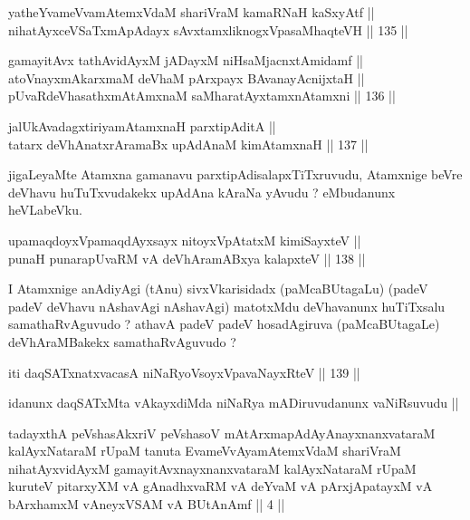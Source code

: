 \begin{shl}
yatheYvameVvamAtemxVdaM shariVraM kamaRNaH kaSxyAtf || \\
nihatAyxceVSaTxmApAdayx sAvxtamxliknogxVpasaMhaqteVH \hfill || 135 ||  
\end{shl}

\begin{shl}
gamayitAvx tathA\s vidAyxM jADayxM niHsaMjacnxtAmidamf ||  \\
atoV\s nayxmAkarxmaM deVhaM pArxpayx BAvanayA\s cnijxtaH || \\
pUvaRdeVhasathxmAtAmxnaM saMharatAyxtamxnA\s \s tamxni \hfill || 136 ||  
\end{shl}

\begin{shl}
jalUkAvadagxtiriyamAtamxnaH parxtipAditA || \\
tatarx deVhAnatxrAramaBx upAdAnaM kimAtamxnaH \hfill || 137 ||  
\end{shl}

\begin{artha}
jigaLeyaMte Atamxna gamanavu parxtipAdisalapxTiTxruvudu, Atamxnige
beVre deVhavu huTuTxvudakekx upAdAna kAraNa yAvudu ? eMbudanunx
heVLabeVku.
\end{artha}


\begin{shl}
upamaqdoyxVpamaqdAyxsayx nitoyxVpAtatxM kimiSayxteV ||  \\
punaH punarapUvaRM vA deVhAramABxya kalapxteV \hfill || 138 ||  
\end{shl}

\begin{artha}
I Atamxnige anAdiyAgi (tAnu) sivxVkarisidadx (paMcaBUtagaLu) (padeV
padeV deVhavu nAshavAgi nAshavAgi) matotxMdu deVhavanunx huTiTxsalu
samathaRvAguvudo ? athavA padeV padeV hosadAgiruva (paMcaBUtagaLe)
deVhAraMBakekx samathaRvAguvudo ?
\end{artha}


\begin{shl}
iti daqSATxnatxvacasA niNaRyoV\s soyxVpavaNayxRteV \hfill || 139 ||
\end{shl}

\begin{artha}
idanunx daqSATxMta vAkayxdiMda niNaRya mADiruvudanunx vaNiRsuvudu ||
\end{artha}

\begin{shl}
tadayxthA peVshasAkxriV peVshasoV mAtArxmapAdAyAnayxnanxvataraM kalAyxNataraM rUpaM tanuta EvameVvAyamAtemxVdaM shariVraM nihatAyxvidAyxM gamayitAvxnayxnanxvataraM kalAyxNataraM rUpaM kuruteV pitarxyXM vA gAnadhxvaRM vA deYvaM vA pArxjApatayxM vA bArxhamxM vAneyxVSAM vA BUtAnAmf || 4 ||
\end{shl}


